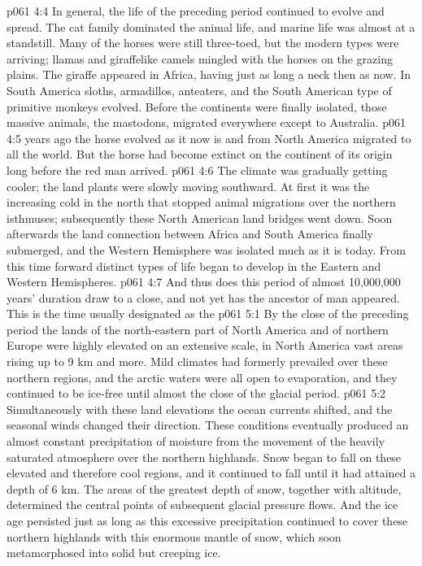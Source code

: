 \vs p061 4:4 In general, the life of the preceding period continued to evolve and spread. The cat family dominated the animal life, and marine life was almost at a standstill. Many of the horses were still three\hyp{}toed, but the modern types were arriving; llamas and giraffelike camels mingled with the horses on the grazing plains. The giraffe appeared in Africa, having just as long a neck then as now. In South America sloths, armadillos, anteaters, and the South American type of primitive monkeys evolved. Before the continents were finally isolated, those massive animals, the mastodons, migrated everywhere except to Australia.
\vs p061 4:5 \pc {} years ago the horse evolved as it now is and from North America migrated to all the world. But the horse had become extinct on the continent of its origin long before the red man arrived.
\vs p061 4:6 The climate was gradually getting cooler; the land plants were slowly moving southward. At first it was the increasing cold in the north that stopped animal migrations over the northern isthmuses; subsequently these North American land bridges went down. Soon afterwards the land connection between Africa and South America finally submerged, and the Western Hemisphere was isolated much as it is today. From this time forward distinct types of life began to develop in the Eastern and Western Hemispheres.
\vs p061 4:7 \pc And thus does this period of almost 10,000,000 years’ duration draw to a close, and not yet has the ancestor of man appeared. This is the time usually designated as the 
\vs p061 5:1 By the close of the preceding period the lands of the north\hyp{}eastern part of North America and of northern Europe were highly elevated on an extensive scale, in North America vast areas rising up to 9 km and more. Mild climates had formerly prevailed over these northern regions, and the arctic waters were all open to evaporation, and they continued to be ice\hyp{}free until almost the close of the glacial period.
\vs p061 5:2 Simultaneously with these land elevations the ocean currents shifted, and the seasonal winds changed their direction. These conditions eventually produced an almost constant precipitation of moisture from the movement of the heavily saturated atmosphere over the northern highlands. Snow began to fall on these elevated and therefore cool regions, and it continued to fall until it had attained a depth of 6 km. The areas of the greatest depth of snow, together with altitude, determined the central points of subsequent glacial pressure flows. And the ice age persisted just as long as this excessive precipitation continued to cover these northern highlands with this enormous mantle of snow, which soon metamorphosed into solid but creeping ice.
